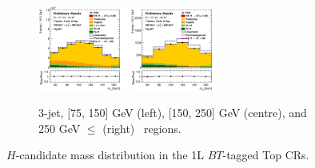 \begin{figure}[h!]
\begin{subfigure}[b]{\textwidth}
        \includegraphics[width=0.32\textwidth]{Images/VH/Own_fit/postfit_VHcc/Region_distmBB_BMax250_BMin150_DtopCRBC_J3_TTypebt_T1_L1_Y6051_GlobalFit_conditionnal_mu1.png}
        \includegraphics[width=0.32\textwidth]{Images/VH/Own_fit/postfit_VHcc/Region_distmBB_BMax400_BMin250_DtopCRBC_J3_TTypebt_T1_L1_Y6051_GlobalFit_conditionnal_mu1.png}
        \caption{3-jet, [75, 150] GeV (left), [150, 250] GeV (centre), and 250 GeV $\leq$ (right) \ptv\ regions.}
        \label{fig:plots_VHcc_1L_TopCR_3J}
    \end{subfigure}
    \caption{$H$-candidate mass distribution in the 1L $BT$-tagged Top CRs.}
    \label{fig:plots_VHcc_1L_TopCR}
\end{figure}
